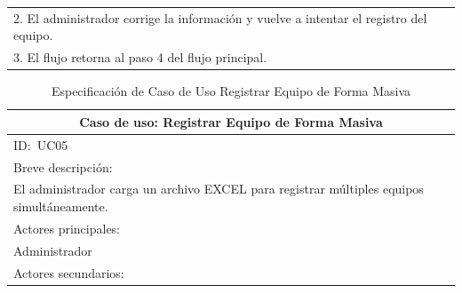 \documentclass[stu, 12pt, letterpaper, donotrepeattitle, floatsintext, natbib]{apa7}
\begin{document}
\begin{longtable}{@{} p{16.5cm} @{}}
    \hspace{1cm}2. El administrador corrige la informaci\'on y vuelve a intentar el registro del equipo.                                                                                                                                                                                       \\
    \hspace{1cm}3. El flujo retorna al paso 4 del flujo principal.                                                                                                                                                                                                                             \\ \bottomrule
\end{longtable}
\newpage
\begin{longtable}{@{} p{16.5cm} @{}}
    \caption{Especificaci\'on de Caso de Uso Registrar Equipo de Forma Masiva}\label{tab:UC05}                                                                                      \\ \toprule
    \multicolumn{1}{c}{Caso de uso: Registrar Equipo de Forma Masiva}                                                                                                               \\ \midrule
    ID:~UC05                                                                                                                                                                        \\ \midrule
    Breve descripci\'on:                                                                                                                                                            \\
    El administrador carga un archivo EXCEL para registrar m\'ultiples equipos simult\'aneamente.                                                                                   \\ \midrule
    Actores principales:                                                                                                                                                            \\
    Administrador                                                                                                                                                                   \\ \midrule
    Actores secundarios:                                                                                                                                                            \\

\end{longtable}
\end{document}
